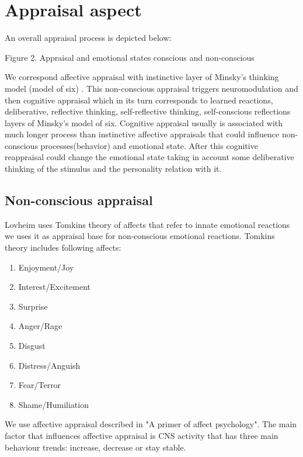 \section{Appraisal aspect}

An overall appraisal process is depicted below:

\begin{center}
Figure 2. Appraisal and emotional states conscious and non-conscious
\end{center}

We correspond affective appraisal with instinctive layer of Minsky's thinking model (model of six) \cite{emotionmachine}. This non-conscious appraisal triggers neuromodulation \cite{cubeofemotions} and then cognitive appraisal which in its turn corresponds to learned reactions, deliberative, reflective thinking, self-reflective thinking, self-conscious reflections layers of Minsky's model of six. Cognitive appraisal usually is associated with much longer process than instinctive affective appraisals that could influence non-conscious processes(behavior) and emotional state. After this cognitive reappraisal could change the emotional state taking in account some deliberative thinking of the stimulus and the personality relation with it.

\subsection{Non-conscious appraisal}

Lovheim uses Tomkins theory of affects that refer to innate emotional reactions we uses it as appraisal base for non-conscious emotional reactions. Tomkins theory \cite{tomkins1, tomkins2, tomkins3, quest} includes following affects:

\begin{enumerate}
 \item  Enjoyment/Joy
 \item  Interest/Excitement
 \item  Surprise
 \item  Anger/Rage
 \item  Disgust
 \item  Distress/Anguish
 \item  Fear/Terror
 \item  Shame/Humiliation
\end{enumerate}

We use affective appraisal described in "A primer of affect psychology"\cite{primer_affect_psychology}. The main factor that influences affective appraisal is CNS activity that has three main behaviour trends: increase, decrease or stay stable.

